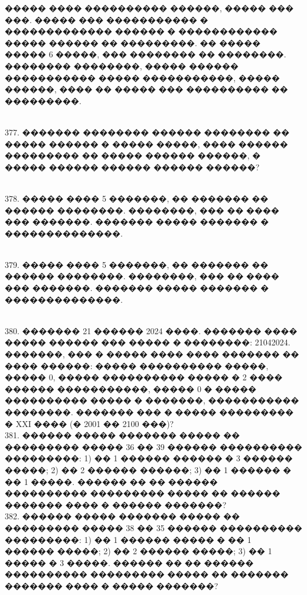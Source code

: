 \documentclass[12pt]{article}
\begin{document}
����� ���� ���������� ������, ����� ��� ���. ����� ��� ����������� � ������������� ������
� ������������ ����� ������ �� ���������. �� ����� ����� 6 �����, ��� �������� �� ��������.
�������� ��������, ����� ������ ����������� ����� �����������, ����� ������, ���� �� ����� ���
���������� �� ���������.\\
\begin{figure}[ht!]
\end{figure}\\
377. ������� �������� ������ �������� �� ����� ������ � ����� �����, ���� ������ ��������� �� ����� ������
������, � ����� ������ ������ ������ ������?\\
\begin{figure}[ht!]
\end{figure}\\
378. ����� ���� 5 �������, �� ������� �� ������ ��������. ��������, ��� �� ���� ��� �������.
������� ����� ������� � ��������������.\\
\begin{figure}[ht!]
\end{figure}\\
379. ����� ���� 5 �������, �� ������� �� ������ ��������. ��������, ��� �� ���� ��� �������.
������� ����� ������� � ��������������.\\
\begin{figure}[ht!]
\end{figure}\\
380.  ������� 21 ������ 2024 ����. ������� ���� ����� ������ ��� ����� � ��������: 21042024.
�������, ��� � ����� ���� ���� ������� �� ���� ������: ����� ���������� �����, ����� 0, �����
���������� ����� � 2 ���� ������ �����������, ����� 0 � ����� ���������� ����� � �������,
����������� ��������. ������� ��� � ����� ��������� � XXI ���� (� 2001 �� 2100 ���)?\\
381. ������ ����� ������� ����� �� ��������� ����� 36 �� 39 ������ ���������� ���������:
1) �� 1 ������ ������ � 3 ������ �����; 2) �� 2 ������ ������; 3) �� 1 ������ � �� 1 �����.
������ �� �� ������ ���������� ��������� ����� �� ������ ������� ���� � ������ �������?\\
382.  ������ ����� ������� ����� �� ��������� ����� 38 �� 35 ������ ���������� ���������:
1) �� 1 ������ ����� � �� 1 ������ �����; 2) �� 2 ������ �����; 3) �� 1 ����� � 3 �����.
������ �� �� ������ ���������� ��������� ����� �� ������� ������� ���� � ����� �������?\\
\end{document}
